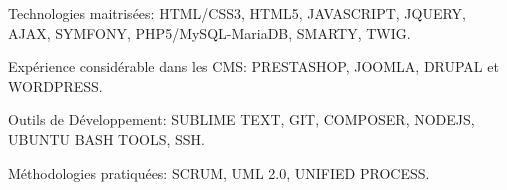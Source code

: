 \begin{cventries}
  \cventry
    {}
    {}
    {}
    {}
    {
      \begin{cvitems}
        \item {Technologies maitrisées: HTML/CSS3, HTML5, JAVASCRIPT, JQUERY, AJAX, SYMFONY, PHP5/MySQL-MariaDB, SMARTY, TWIG.}
        \item {Expérience considérable dans les CMS: PRESTASHOP, JOOMLA, DRUPAL et WORDPRESS.}
        \item {Outils de Développement: SUBLIME TEXT, GIT, COMPOSER, NODEJS, UBUNTU BASH TOOLS, SSH.}
        \item {Méthodologie​s pratiquées: SCRUM, UML 2.0, UNIFIED PROCESS.}
      \end{cvitems}
    }
\end{cventries}